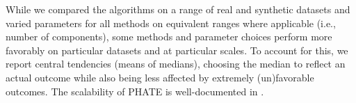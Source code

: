 While we compared the algorithms on a range of real and synthetic datasets and varied parameters for all methods on equivalent ranges where applicable (i.e., number of components), some methods and parameter choices perform more favorably on particular datasets and at particular scales. To account for this, we report central tendencies (means of medians), choosing the median to reflect an actual outcome while also being less affected by extremely (un)favorable outcomes. The scalability of PHATE is well-documented in \citet{moon2019visualizing}. 